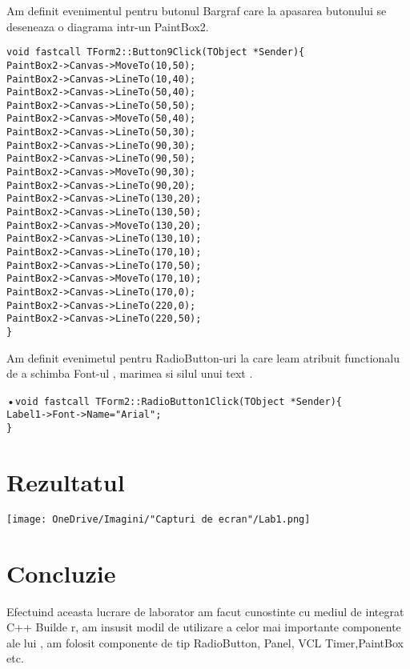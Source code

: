 \documentclass[11pt]{article}
\begin{document}
   Am definit evenimentul pentru butonul Bargraf care la apasarea butonului se deseneaza o diagrama intr-un PaintBox2.\\
   
   \begin{center}
   \texttt{void fastcall TForm2::Button9Click(TObject *Sender)\{\\
 PaintBox2->Canvas->MoveTo(10,50);\\
PaintBox2->Canvas->LineTo(10,40);\\
PaintBox2->Canvas->LineTo(50,40);\\
PaintBox2->Canvas->LineTo(50,50);\\
PaintBox2->Canvas->MoveTo(50,40);\\
PaintBox2->Canvas->LineTo(50,30);\\
PaintBox2->Canvas->LineTo(90,30);\\
PaintBox2->Canvas->LineTo(90,50);\\
PaintBox2->Canvas->MoveTo(90,30);\\
PaintBox2->Canvas->LineTo(90,20);\\
PaintBox2->Canvas->LineTo(130,20);\\
PaintBox2->Canvas->LineTo(130,50);\\
PaintBox2->Canvas->MoveTo(130,20);\\
PaintBox2->Canvas->LineTo(130,10);\\
PaintBox2->Canvas->LineTo(170,10);\\
PaintBox2->Canvas->LineTo(170,50);\\
PaintBox2->Canvas->MoveTo(170,10);\\
PaintBox2->Canvas->LineTo(170,0);\\
PaintBox2->Canvas->LineTo(220,0);\\
PaintBox2->Canvas->LineTo(220,50);\\ \}\\}
   \end{center}
   
   Am definit evenimetul pentru RadioButton-uri la care leam atribuit functionalu de a schimba Font-ul , marimea si silul  unui text .\\
   \begin{center}
   •\texttt{void fastcall TForm2::RadioButton1Click(TObject *Sender)\{ \\
Label1->Font->Name="Arial";\\ \}}
   \end{center}
   
   \section{Rezultatul}
 \begin{center}
\texttt{[image: OneDrive/Imagini/"Capturi de ecran"/Lab1.png]} 
\end{center}


\section{Concluzie}
Efectuind aceasta lucrare de laborator am facut cunostinte cu mediul de integrat C++ Builde r, am insusit  modil de utilizare a celor mai importante  componente ale lui , am folosit componente de tip RadioButton, Panel, VCL Timer,PaintBox etc.
\end{document}
